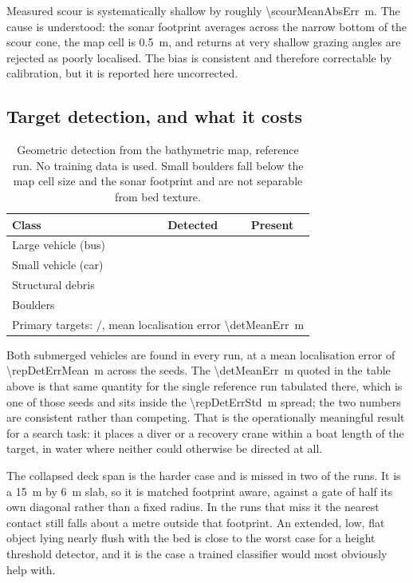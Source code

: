 \documentclass[10pt,a4paper]{article}
\begin{document}
Measured scour is systematically shallow by roughly
\SI{\scourMeanAbsErr}{\metre}. The cause is understood: the sonar footprint
averages across the narrow bottom of the scour cone, the map cell is
\SI{0.5}{\metre}, and returns at very shallow grazing angles are rejected as
poorly localised. The bias is consistent and therefore correctable by
calibration, but it is reported here uncorrected.

\subsection{Target detection, and what it costs}

\begin{table}[htbp]\centering\small
\caption{Geometric detection from the bathymetric map, reference run. No
training data is used. Small boulders fall below the map cell size and the
sonar footprint and are not separable from bed texture.}
\begin{tabular}{lcc}
\toprule
\textbf{Class} & \textbf{Detected} & \textbf{Present} \\
\midrule
Large vehicle (bus) & \detVehicleLargeHit{} & \detVehicleLargeTot{} \\
Small vehicle (car) & \detVehicleSmallHit{} & \detVehicleSmallTot{} \\
Structural debris & \detStructureHit{} & \detStructureTot{} \\
Boulders & \detBoulderHit{} & \detBoulderTot{} \\
\midrule
\multicolumn{3}{l}{Primary targets: \detPrimary{}/\detPrimaryTotal{},
mean localisation error \SI{\detMeanErr}{\metre}} \\
\bottomrule
\end{tabular}
\end{table}

Both submerged vehicles are found in every run, at a mean localisation error of
\SI{\repDetErrMean}{\metre} across the \repRuns{} seeds. The \SI{\detMeanErr}{\metre} quoted in
the table above is that same quantity for the single reference run tabulated
there, which is one of those seeds and sits inside the \SI{\repDetErrStd}{\metre}
spread; the two numbers are consistent rather than competing. That is the operationally meaningful
result for a search task: it places a diver or a recovery crane within a boat
length of the target, in water where neither could otherwise be directed at
all.

The collapsed deck span is the harder case and is missed in two of the
\detRuns{} runs. It is a \SI{15}{\metre} by \SI{6}{\metre} slab, so it is
matched footprint aware, against a gate of half its own diagonal rather than a
fixed radius. In the runs that miss it the nearest contact still falls about a
metre outside that footprint. An extended, low, flat object lying nearly flush
with the bed is close to the worst case for a height threshold detector, and it
is the case a trained classifier would most obviously help with.
\end{document}
